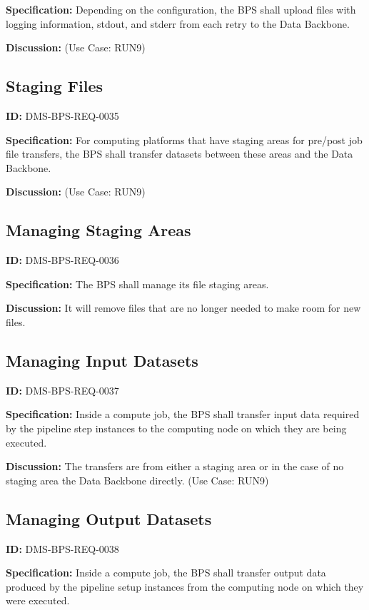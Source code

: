 \documentclass[SE,toc]{lsstdoc}
\begin{document}
\textbf{Specification:}
Depending on the configuration, the BPS shall upload files with logging information, stdout, and stderr from each retry to the Data Backbone.

\textbf{Discussion:}
(Use Case: RUN9)

\subsection{Staging Files}

\label{DMS-BPS-REQ-0035}
\textbf{ID:} DMS-BPS-REQ-0035

\textbf{Specification:}
For computing platforms that have staging areas for pre/post job file transfers, the BPS shall transfer datasets between these areas and the Data Backbone.

\textbf{Discussion:}
(Use Case: RUN9)

\subsection{Managing Staging Areas}

\label{DMS-BPS-REQ-0036}
\textbf{ID:} DMS-BPS-REQ-0036

\textbf{Specification:}
The BPS shall manage its file staging areas.

\textbf{Discussion:}
It will remove files that are no longer needed to make room for new files.

\subsection{Managing Input Datasets}

\label{DMS-BPS-REQ-0037}
\textbf{ID:} DMS-BPS-REQ-0037

\textbf{Specification:}
Inside a compute job, the BPS shall transfer input data required by the pipeline step instances to the computing node on which they are being executed.

\textbf{Discussion:}
The transfers are from either a staging area or in the case of no staging area the Data Backbone directly.  (Use Case: RUN9)

\subsection{Managing Output Datasets}

\label{DMS-BPS-REQ-0038}
\textbf{ID:} DMS-BPS-REQ-0038

\textbf{Specification:}
Inside a compute job, the BPS shall transfer output data produced by the pipeline setup instances from the computing node on which they were executed.
\end{document}
